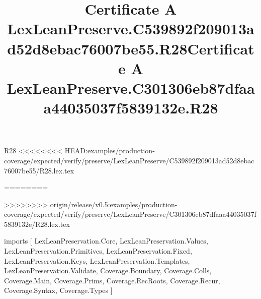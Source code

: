 \begin{lexlean}{R28}
<<<<<<<< HEAD:examples/production-coverage/expected/verify/preserve/LexLeanPreserve/C539892f209013ad52d8ebac76007be55/R28.lex.tex
\title{Certificate A LexLeanPreserve.C539892f209013ad52d8ebac76007be55.R28}
========
\title{Certificate A LexLeanPreserve.C301306eb87dfaaa44035037f5839132e.R28}
>>>>>>>> origin/release/v0.5:examples/production-coverage/expected/verify/preserve/LexLeanPreserve/C301306eb87dfaaa44035037f5839132e/R28.lex.tex
\begin{coremodule}
imports [
  LexLeanPreservation.Core,
  LexLeanPreservation.Values,
  LexLeanPreservation.Primitives,
  LexLeanPreservation.Fixed,
  LexLeanPreservation.Keys,
  LexLeanPreservation.Templates,
  LexLeanPreservation.Validate,
  Coverage.Boundary,
  Coverage.Colls,
  Coverage.Main,
  Coverage.Prims,
  Coverage.RecRoots,
  Coverage.Recur,
  Coverage.Syntax,
  Coverage.Types
]


\end{coremodule}
\end{lexlean}
